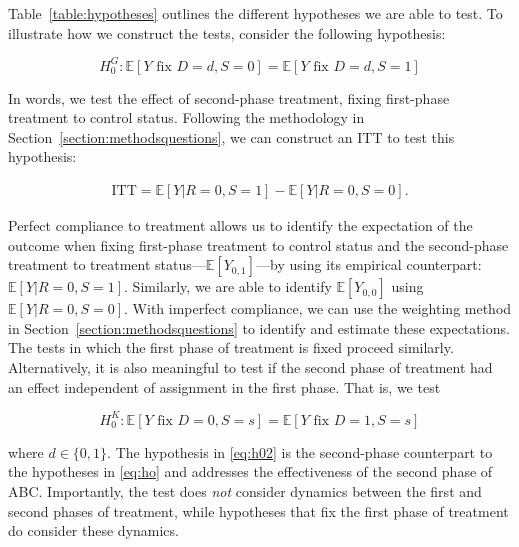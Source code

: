 \noindent Table~\ref{table:hypotheses} outlines the different hypotheses we are able to test. To illustrate how we construct the tests, consider the following hypothesis: 

\begin{equation}
H_{0}^G: \mathbb{E} \left[ Y \text{ fix } D = d, S = 0 \right]  = \mathbb{E} \left[ Y \text{ fix } D = d, S = 1 \right]  \label{eq:h0fixfirst}
\end{equation}

\noindent In words, we test the effect of second-phase treatment, fixing first-phase treatment to control status. Following the methodology in Section~\ref{section:methodsquestions}, we can construct an ITT to test this hypothesis: 

\begin{eqnarray}
\text{ITT} = \mathbb{E} \left[ Y | R = 0, S = 1 \right] - \mathbb{E} \left[ Y | R = 0, S = 0 \right]. 
\end{eqnarray}

\noindent Perfect compliance to treatment allows us to identify the expectation of the outcome when fixing first-phase treatment to control status and the second-phase treatment to treatment status---$\mathbb{E} \left[ Y_{0,1} \right]$---by using its empirical counterpart: $\mathbb{E} \left[ Y | R = 0, S = 1 \right]$. Similarly, we are able to identify $\mathbb{E} \left[ Y_{0,0} \right]$ using $\mathbb{E} \left[ Y | R = 0, S = 0 \right]$. With imperfect compliance, we can use the weighting method in Section~\ref{section:methodsquestions} to identify and estimate these expectations. The tests in which the first phase of treatment is fixed proceed similarly.\\

\noindent Alternatively, it is also meaningful to test if the second phase of treatment had an effect independent of assignment in the first phase. That is, we test 

\begin{equation}
H_{0}^K: \mathbb{E} \left[ Y \text{ fix } D = 0, S = s \right] = \mathbb{E} \left[ Y \text{ fix } D = 1, S = s \right] \label{eq:h02}
\end{equation}

\noindent where $d \in \{0,1\}$. The hypothesis in \eqref{eq:h02} is the second-phase counterpart to the hypotheses in \eqref{eq:ho} and addresses the effectiveness of the second phase of ABC. Importantly, the test does \emph{not} consider dynamics between the first and second phases of treatment, while hypotheses that fix the first phase of treatment do consider these dynamics.\\

